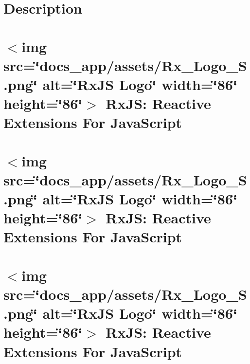 \documentclass[twoside]{book}
\newcommand{\+}{\discretionary{\mbox{\scriptsize$\hookleftarrow$}}{}{}}
\begin{document}
\chapter{Description}
\label{md__c___users_vaishnavi_jadhav__desktop__developer_code_mean_stack_example_client_node_modules__d47179af5856aa4a2131a79994757592}

\chapter{\texorpdfstring{$<$}{<}img src=\char`\"{}docs\+\_\+app/assets/\+Rx\+\_\+\+Logo\+\_\+\+S.\+png\char`\"{} alt=\char`\"{}\+Rx\+JS Logo\char`\"{} width=\char`\"{}86\char`\"{} height=\char`\"{}86\char`\"{}\texorpdfstring{$>$}{>} Rx\+JS\+: Reactive Extensions For Java\+Script}
\label{md__c___users_vaishnavi_jadhav__desktop__developer_code_mean_stack_example_client_node_modules__5cd58aaf2d1009adbd86ba6ea1d6a1cf}

\chapter{\texorpdfstring{$<$}{<}img src=\char`\"{}docs\+\_\+app/assets/\+Rx\+\_\+\+Logo\+\_\+\+S.\+png\char`\"{} alt=\char`\"{}\+Rx\+JS Logo\char`\"{} width=\char`\"{}86\char`\"{} height=\char`\"{}86\char`\"{}\texorpdfstring{$>$}{>} Rx\+JS\+: Reactive Extensions For Java\+Script}
\label{md__c___users_vaishnavi_jadhav__desktop__developer_code_mean_stack_example_client_node_modules__2a7b4f81d902719c9c93267d5fe8b234}

\chapter{\texorpdfstring{$<$}{<}img src=\char`\"{}docs\+\_\+app/assets/\+Rx\+\_\+\+Logo\+\_\+\+S.\+png\char`\"{} alt=\char`\"{}\+Rx\+JS Logo\char`\"{} width=\char`\"{}86\char`\"{} height=\char`\"{}86\char`\"{}\texorpdfstring{$>$}{>} Rx\+JS\+: Reactive Extensions For Java\+Script}
\label{md__c___users_vaishnavi_jadhav__desktop__developer_code_mean_stack_example_client_node_modules__7d3b4d0049fcc0b600ae7574c1339f50}

\end{document}
